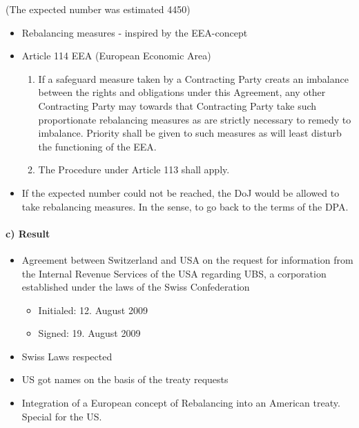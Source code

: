 \begin{enumerate}[1)]
        (The expected number was estimated 4450)
        \begin{itemize}
            \item Rebalancing measures - inspired by the EEA-concept
            \item Article 114 EEA (European Economic Area)
                \begin{enumerate}[1.]
                    \item If a safeguard measure taken by a Contracting Party creats
                        an imbalance between the rights and obligations under this
                        Agreement, any other Contracting Party may towards that
                        Contracting Party take such proportionate rebalancing
                        measures as are strictly necessary to remedy to imbalance.
                        Priority shall be given to such measures as will least
                        disturb the functioning of the EEA.
                    \item The Procedure under Article 113 shall apply.
                \end{enumerate}
            \item If the expected number could not be reached, the DoJ would be
                allowed to take rebalancing measures. In the sense, to go back
                to the terms of the DPA.
        \end{itemize}
\end{enumerate}

\paragraph{c) Result}

\begin{itemize}
    \item Agreement between Switzerland and USA on the request for information
        from the Internal Revenue Services of the USA regarding UBS, a corporation
        established under the laws of the Swiss Confederation
        \begin{itemize}
            \item Initialed: 12. August 2009
            \item Signed: 19. August 2009
        \end{itemize}
    \item Swiss Laws respected
    \item US got names on the basis of the treaty requests
    \item Integration of a European concept of Rebalancing into an American
        treaty. Special for the US.
\end{itemize}

